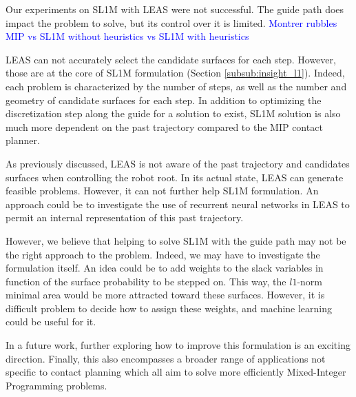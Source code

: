 Our experiments on SL1M with LEAS were not successful.
The guide path does impact the problem to solve, but its control over it is limited.
\textcolor{blue}{Montrer rubbles MIP vs SL1M without heuristics vs SL1M with heuristics}

LEAS can not accurately select the candidate surfaces for each step. However, those are at the core of SL1M formulation (Section \ref{subsub:insight_l1}). 
Indeed, each problem is characterized by the number of steps, as well as the number and geometry of candidate surfaces for each step.
In addition to optimizing the discretization step along the guide for a solution to exist, SL1M solution is also much more dependent on the past trajectory compared to the MIP contact planner.

As previously discussed, LEAS is not aware of the past trajectory and candidates surfaces when controlling the robot root. 
In its actual state, LEAS can generate feasible problems. However, it can not further help SL1M formulation.
An approach could be to investigate the use of recurrent neural networks in LEAS to permit an internal representation of this past trajectory.

However, we believe that helping to solve SL1M with the guide path may not be the right approach to the problem.
Indeed, we may have to investigate the formulation itself.
An idea could be to add weights to the slack variables in function of the surface probability to be stepped on.
This way, the $l1$-norm minimal area would be more attracted toward these surfaces. 
However, it is difficult problem to decide how to assign these weights, and machine learning could be useful for it.

In a future work, further exploring how to improve this formulation is an exciting direction. 
Finally, this also encompasses a broader range of applications not specific to contact planning which all aim to solve more efficiently Mixed-Integer Programming problems.